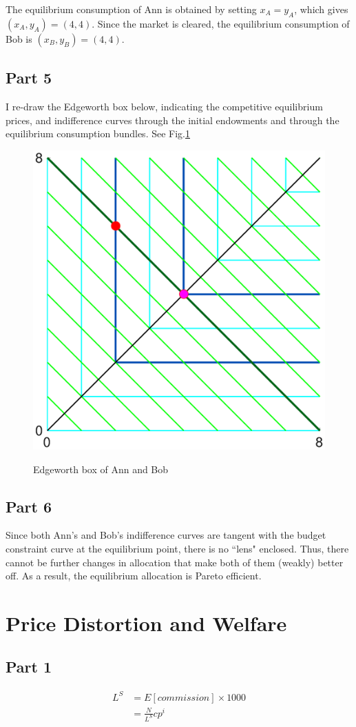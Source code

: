 \documentclass{article}
\begin{document}
The equilibrium consumption of Ann is obtained by setting $x_A=y_A$, which gives $(x_A,y_A)=(4,4)$. Since the market is cleared, the equilibrium consumption of Bob is $(x_B,y_B)=(4,4)$.

\subsection{Part 5}
I re-draw the Edgeworth box below, indicating the competitive equilibrium prices, and indifference curves through the initial endowments and through the equilibrium consumption bundles. See Fig.\ref{EdgeworthNew}
\begin{figure}[!htbp]
	\centering
	\includegraphics[width=12cm]{figure4.eps}\\
	\caption{Edgeworth box of Ann and Bob}
	\label{EdgeworthNew}
\end{figure}

\subsection{Part 6}
Since both Ann's and Bob's indifference curves are tangent with the budget constraint curve at the equilibrium point, there is no ``lens" enclosed. Thus, there cannot be further changes in allocation that make both of them (weakly) better off. As a result, the equilibrium allocation is Pareto efficient.

\section{Price Distortion and Welfare}
\subsection{Part 1}
\begin{align*}
L^S&=E[commission]\times 1000\\
&=\frac{N}{L^S}cp^i
\end{align*}
\end{document}
